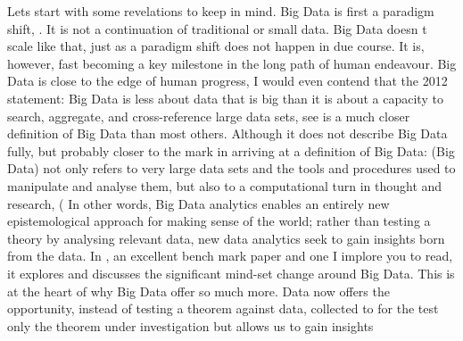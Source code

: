 Lets start with some revelations to keep in mind.  Big Data is first a paradigm shift,  \cite{Hey09}. It is not a continuation of traditional or small data.  Big Data doesn \textquotesingle t scale like that, just as a paradigm shift does not happen in due course.  It is, however, fast becoming a key milestone in the long path of human endeavour.  Big Data is close to the edge of human progress, \cite{Cuk13} I would even contend that the 2012 statement:  Big Data is less about data that is big than it is about a capacity to search, aggregate, and cross-reference large data sets, see \cite{Boy12}  is a much closer definition of Big Data than most others.  Although it does not describe Big Data fully, but probably closer to the mark in arriving at a definition of Big Data: (Big Data) not only refers to very large data sets and the tools and procedures used to manipulate and analyse them, but also to a computational turn in thought and research, (\cite{Bur92}
In other words, Big Data analytics enables an entirely new epistemological approach for making sense of the world; rather than testing a theory by analysing relevant data, new data analytics seek to gain insights born from the data.  In \cite{Kit81}, an excellent bench mark paper and one I implore you to read, it explores and discusses the significant mind-set change around Big Data.  This is at the heart of why Big Data offer so much more.   Data now offers the opportunity, instead of testing a theorem against data, collected to for the test only the theorem under investigation but allows us to gain insights 


